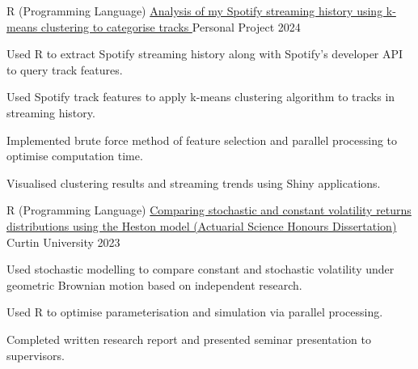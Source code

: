 \begin{cventries}
  \cventry
    {R (Programming Language)} %
    {\href{https://harryz.netlify.app/projects/spotify-analysis/}{Analysis of my Spotify streaming history using k-means clustering to categorise tracks \ExternalLink}} %
    {Personal Project} %
    {2024} %
    {
      \begin{cvitems} %
        \item {Used R to extract Spotify streaming history along with Spotify's developer API to query track features.}
        \item {Used Spotify track features to apply k-means clustering algorithm to tracks in streaming history.}
        \item {Implemented brute force method of feature selection and parallel processing to optimise computation time.}
        \item {Visualised clustering results and streaming trends using Shiny applications.}
      \end{cvitems}
    }

  \cventry
    {R (Programming Language)} %
    {\href{https://www.researchgate.net/publication/372915363_Comparing_Stochastic_and_Constant_Volatility_Returns_Distributions_using_the_Heston_Model}{Comparing stochastic and constant volatility returns distributions using the Heston model (Actuarial Science Honours Dissertation) \ExternalLink}} %
    {Curtin University} %
    {2023} %
    {
      \begin{cvitems} %
        \item {Used stochastic modelling to compare constant and stochastic volatility under geometric Brownian motion based on independent research.}
        \item {Used R to optimise parameterisation and simulation via parallel processing.}
        \item {Completed written research report and presented seminar presentation to supervisors.}
      \end{cvitems}
    }
\end{cventries}
